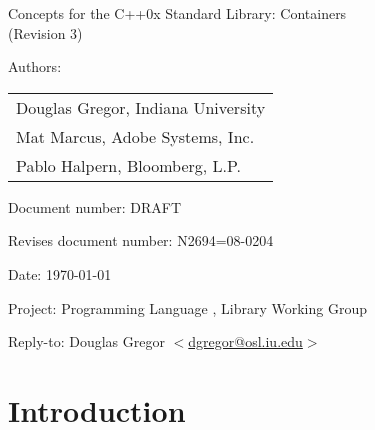 \documentclass[american,twoside]{book}
\begin{document}
\raggedbottom

\begin{titlepage}
\begin{center}
\huge
Concepts for the C++0x Standard Library: Containers\\
(Revision 3)
\end{center}

\normalsize

\vspace{0.5in}
\par\noindent Authors: 
\begin{tabular}[t]{l}
Douglas Gregor, Indiana University \\
Mat Marcus, Adobe Systems, Inc.\\
Pablo Halpern,  Bloomberg, L.P.
\end{tabular}\vspace{-6pt}
\par\noindent Document number: DRAFT\vspace{-6pt}
\par\noindent Revises document number: N2694=08-0204\vspace{-6pt}
\par\noindent Date: \today\vspace{-6pt}
\par\noindent Project: Programming Language \Cpp{}, Library Working Group\vspace{-6pt}
\par\noindent Reply-to: Douglas Gregor $<$\href{mailto:dgregor@osl.iu.edu}{dgregor@osl.iu.edu}$>$\vspace{-6pt}

\section*{Introduction}


\end{titlepage}
\end{document}
